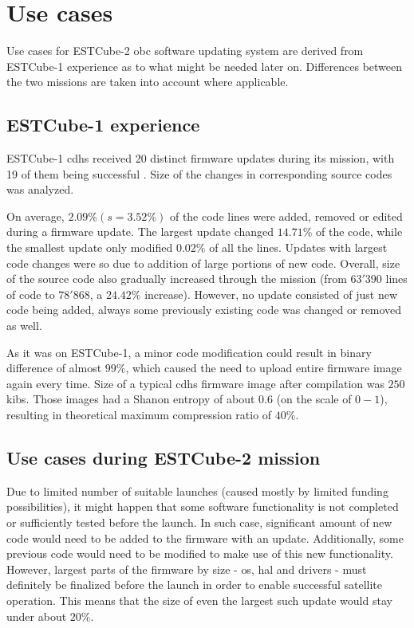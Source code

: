 \newpage
\section{Use cases}

Use cases for ESTCube-2 \gls{obc} software updating system are derived from ESTCube-1 experience as to what might be needed later on. Differences between the two missions are taken into account where applicable.

\subsection{ESTCube-1 experience}

ESTCube-1 \gls{cdhs} received 20 distinct firmware updates during its mission, with 19 of them being successful \cite{Suenter2016}. Size of the changes in corresponding source codes was analyzed.

On average, $2.09\% (s=3.52\%)$ of the code lines were added, removed or edited during a firmware update. The largest update changed $14.71\%$ of the code, while the smallest update only modified $0.02\%$ of all the lines. Updates with largest code changes were so due to addition of large portions of new code. Overall, size of the source code also gradually increased through the mission (from $63'390$ lines of code to $78'868$, a $24.42\%$ increase). However, no update consisted of just new code being added, always some previously existing code was changed or removed as well.

As it was on ESTCube-1, a minor code modification could result in binary difference of almost $99\%$, which caused the need to upload entire firmware image again every time. Size of a typical \gls{cdhs} firmware image after compilation was $250$ \glspl{kib}. Those images had a Shanon entropy of about $0.6$ (on the scale of $0-1$), resulting in theoretical maximum compression ratio of $40\%$. \cite{Suenter2016}

\subsection{Use cases during ESTCube-2 mission}

Due to limited number of suitable launches (caused mostly by limited funding possibilities), it might happen that some software functionality is not completed or sufficiently tested before the launch. In such case, significant amount of new code would need to be added to the firmware with an update. Additionally, some previous code would need to be modified to make use of this new functionality. However, largest parts of the firmware by size - \gls{os}, \gls{hal} and drivers - must definitely be finalized before the launch in order to enable successful satellite operation. This means that the size of even the largest such update would stay under about $20\%$.


